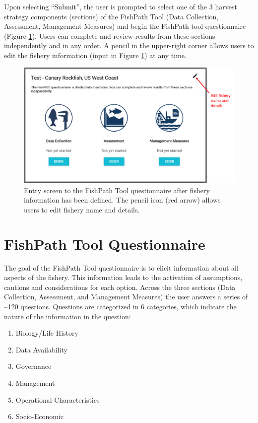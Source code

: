 \documentclass[
  11pt,
]{book}
\providecommand{\tightlist}{%
  \setlength{\itemsep}{0pt}\setlength{\parskip}{0pt}}
\begin{document}
Upon selecting ``Submit'', the user is prompted to select one of the 3 harvest strategy components (sections) of the FishPath Tool (Data Collection, Assessment, Management Measures) and begin the FishPath tool questionnaire (Figure \ref{fig:fishery-entry}). Users can complete and review results from these sections independently and in any order. A pencil in the upper-right corner allows users to edit the fishery information (input in Figure \ref{fig:fishery-entry}) at any time.

\begin{figure}

{\centering \includegraphics[width=0.95\linewidth]{images/fishery-entry-screen} 

}

\caption{Entry screen to the FishPath Tool questionnaire after fishery information has been defined. The pencil icon (red arrow) allows users to edit fishery name and details.}\label{fig:fishery-entry}
\end{figure}

\hypertarget{fishpath-tool-questionnaire}{%
\chapter{FishPath Tool Questionnaire}\label{fishpath-tool-questionnaire}}

The goal of the FishPath Tool questionnaire is to elicit information about all aspects of the fishery. This information leads to the activation of assumptions, cautions and considerations for each option. Across the three sections (Data Collection, Assessment, and Management Measures) the user answers a series of \textasciitilde120 questions. Questions are categorized in 6 categories, which indicate the nature of the information in the question:

\begin{enumerate}
\def\labelenumi{\arabic{enumi}.}
\tightlist
\item
  Biology/Life History
\item
  Data Availability
\item
  Governance
\item
  Management
\item
  Operational Characteristics
\item
  Socio-Economic
\end{enumerate}
\end{document}
